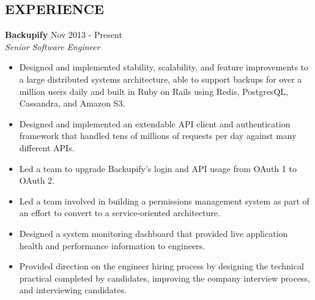 \documentclass[line,margin]{res}
\begin{document}

      \address{anorwell@gmail.com 647-987-3081 \\
      github.com/ANorwell \\
      Toronto, ON }
    
 
\begin{resume}

\section{EXPERIENCE}

    {\bf Backupify} \hfill Nov 2013 - Present \\
    {\sl Senior Software Engineer}
                 \begin{itemize}  \itemsep -2pt %
                 \item Designed and implemented stability, scalability, and feature improvements to a large distributed systems architecture, able to support backups for over a million users daily and built in Ruby on Rails using Redis, PostgresQL, Cassandra, and Amazon S3.\item Designed and implemented an extendable API client and authentication framework that handled tens of millions of requests per day against many different APIs.\item Led a team to upgrade Backupify's login and API usage from OAuth 1 to OAuth 2.\item Led a team involved in building a permissions management system as part of an effort to convert to a service-oriented architecture.\item Designed a system monitoring dashboard that provided live application health and performance information to engineers.\item Provided direction on the engineer hiring process by designing the technical practical completed by candidates, improving the company interview process, and interviewing candidates.
                \end{itemize}
  

\end{resume}
\end{document}
